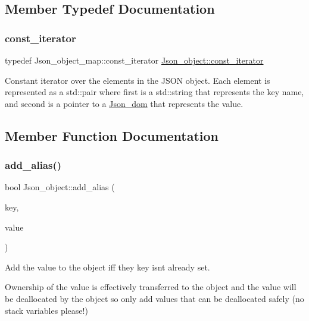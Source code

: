\subsection{Member Typedef Documentation}
\mbox{\label{classJson__object_a318e93bc476422e10673ec7471062eca}} 
\subsubsection{\texorpdfstring{const\+\_\+iterator}{const\_iterator}}
{\footnotesize\ttfamily typedef Json\+\_\+object\+\_\+map\+::const\+\_\+iterator \mbox{\hyperlink{classJson__object_a318e93bc476422e10673ec7471062eca}{Json\+\_\+object\+::const\+\_\+iterator}}}

Constant iterator over the elements in the J\+S\+ON object. Each element is represented as a std\+::pair where first is a std\+::string that represents the key name, and second is a pointer to a \mbox{\hyperlink{classJson__dom}{Json\+\_\+dom}} that represents the value. 

\subsection{Member Function Documentation}
\mbox{\label{classJson__object_aefbdc06876ad7e0b8a7a925df1bfb1ee}} 
\subsubsection{\texorpdfstring{add\+\_\+alias()}{add\_alias()}}
{\footnotesize\ttfamily bool Json\+\_\+object\+::add\+\_\+alias (\begin{DoxyParamCaption}\item[{const std\+::string \&}]{key,  }\item[{\mbox{\hyperlink{classJson__dom}{Json\+\_\+dom}} $\ast$}]{value }\end{DoxyParamCaption})}

Add the value to the object iff they key isn\textquotesingle{}t already set.

Ownership of the value is effectively transferred to the object and the value will be deallocated by the object so only add values that can be deallocated safely (no stack variables please!)


